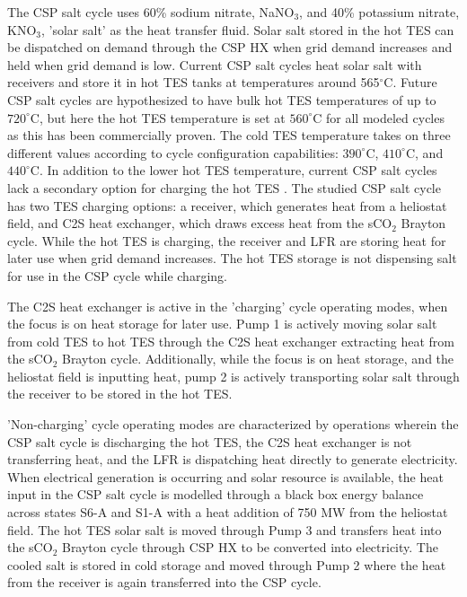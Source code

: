 \begin{paracol}{2}
The CSP salt cycle uses 60\% sodium nitrate, NaNO$_3$, and 40\% potassium nitrate, KNO$_3$, 'solar salt' as the heat transfer fluid. Solar salt stored in the hot TES can be dispatched on demand through the CSP HX when grid demand increases and held when grid demand is low. Current CSP salt cycles heat solar salt with receivers and store it in hot TES tanks at temperatures around 565$^{\circ}$C. Future CSP salt cycles are hypothesized to have bulk hot TES temperatures of up to $720^{\circ}$C, but here the hot TES temperature is set at $560^{\circ}$C for all modeled cycles \cite{mehos2017concentrating} as this has been commercially proven. The cold TES temperature takes on three different values according to cycle configuration capabilities: $390^{\circ}$C, $410^{\circ}$C, and $440^{\circ}$C. In addition to the lower hot TES temperature, current CSP salt cycles lack a secondary option for charging the hot TES \cite{hamilton2020dispatch}. The studied CSP salt cycle has two TES charging options: a receiver, which generates heat from a heliostat field, and C2S heat exchanger, which draws excess heat from the sCO$_2$ Brayton cycle. While the hot TES is charging, the receiver and LFR are storing heat for later use when grid demand increases. The hot TES storage is not dispensing salt for use in the CSP cycle while charging.

The C2S heat exchanger is active in the 'charging' cycle operating modes, when the focus is on heat storage for later use. Pump 1 is actively moving solar salt from cold TES to hot TES through the C2S heat exchanger extracting heat from the sCO$_2$ Brayton cycle. Additionally, while the focus is on heat storage, and the heliostat field is inputting heat, pump 2 is actively transporting solar salt through the receiver to be stored in the hot TES.

'Non-charging' cycle operating modes are characterized by operations wherein the CSP salt cycle is discharging the hot TES, the C2S heat exchanger is not transferring heat, and the LFR is dispatching heat directly to generate electricity. When electrical generation is occurring and solar resource is available, the heat input in the CSP salt cycle is modelled through a black box energy balance across states S6-A and S1-A with a heat addition of 750 MW from the heliostat field. The hot TES solar salt is moved through Pump 3 and transfers heat into the sCO$_{2}$ Brayton cycle through CSP HX to be converted into electricity. The cooled salt is stored in cold storage and moved through Pump 2 where the heat from the receiver is again transferred into the CSP cycle. 


\end{paracol}
